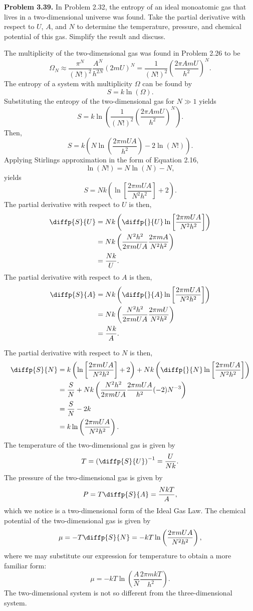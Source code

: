 \documentclass[a4paper, 12pt]{config/homework}
\begin{document}
\pagebreak
\noindent
\textbf{Problem 3.39.} In Problem 2.32, the entropy of an ideal monoatomic gas that lives in a two-dimensional universe was found. Take the partial derivative with respect to \(U\), \(A\), and \(N\) to determine the temperature, pressure, and chemical potential of this gas. Simplify the result and discuss.

\bigskip
\noindent
The multiplicity of the two-dimensional gas was found in Problem 2.26 to be
\[\Omega_N
\approx \frac{\pi^N}{(N!)^2}\frac{A^N}{h^{2N}}\left(2mU\right)^N
= \frac{1}{(N!)^2} \left(\frac{2\pi A m U}{h^2}\right)^N .\]
The entropy of a system with multiplicity \(\Omega\) can be found by
\[S = k\ln\left(\Omega\right).\]
Substituting the entropy of the two-dimensional gas for \(N\gg 1\) yields
\[S = k\ln\left(\frac{1}{(N!)^2} \left(\frac{2\pi A m U}{h^2}\right)^N\right).\]
Then,
\[S = k\left(N\ln\left(\frac{2\pi mUA}{h^2}\right) - 2\ln\left(N!\right)\right).\]
Applying Stirlings approximation in the form of Equation 2.16,
\[\ln(N!) = N\ln(N) - N,\]
yields
\[S = Nk\left(\ln\left[\frac{2\pi mUA}{N^2h^2}\right] + 2\right).\]
The partial derivative with respect to \(U\) is then,
\begin{align*}
\diffp{S}{U} &= Nk\left(\diffp{}{U}\ln\left[\frac{2\pi m U A}{N^2 h^2}\right]\right)
\\&= Nk \left(\frac{N^2 h^2}{2\pi m U A}\frac{2 \pi m A}{N^2 h^2}\right)
\\&= \frac{Nk}{U}.
\end{align*}
The partial derivative with respect to \(A\) is then,
\begin{align*}
\diffp{S}{A} &= Nk\left(\diffp{}{A}\ln\left[\frac{2 \pi m U A}{N^2 h^2}\right]\right)
\\&= Nk \left(\frac{N^2 h^2}{2 \pi m U A}\frac{2 \pi m U}{N^2 h^2}\right)
\\&= \frac{Nk}{A}.
\end{align*}

\pagebreak\noindent
The partial derivative with respect to \(N\) is then,
\begin{align*}
\diffp{S}{N} &= k\left(\ln\left[\frac{2\pi m U A}{N^2 h^2}\right] + 2\right) + Nk\left(\diffp{}{N}\ln\left[\frac{2 \pi m U A}{N^2 h^2}\right]\right)
\\&= \frac{S}{N} + Nk\left(\frac{N^2 h^2}{2\pi m U A}\frac{2\pi m U A}{h^2} (-2)N^{-3}\right)
\\&= \frac{S}{N} - 2k
\\&= k\ln\left(\frac{2\pi m U A}{N^2 h^2}\right).
\end{align*}
The temperature of the two-dimensional gas is given by
\[T = \left(\diffp{S}{U}\right)^{-1} = \frac{U}{Nk}.\]
The pressure of the two-dimensional gas is given by
\[P = T\diffp{S}{A} = \frac{NkT}{A},\]
which we notice is a two-dimensional form of the Ideal Gas Law.
The chemical potential of the two-dimensional gas is given by
\[\mu = -T\diffp{S}{N} = -kT\ln\left(\frac{2\pi m U A}{N^2 h^2}\right),\]
where we may substitute our expression for temperature to obtain a more familiar form:
\[\mu = -kT\ln\left(\frac{A}{N}\frac{2\pi m k T}{h^2}\right).\]
The two-dimensional system is not so different from the three-dimensional system.
\end{document}
